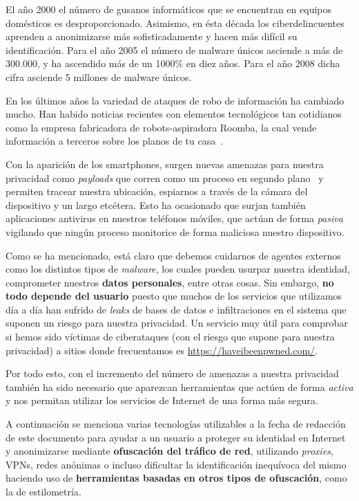 El año 2000 el número de gusanos informáticos que se encuentran en equipos domésticos es desproporcionado. Asimismo, en ésta década los ciberdelincuentes aprenden a anonimizarse más sofisticadamente y hacen más difícil su identificación.
Para el año 2005 el número de malware únicos asciende a más de 300.000, y ha ascendido más de un 1000\% en diez años. Para el año 2008 dicha cifra asciende 5 millones de malware únicos.~\cite{article:number_malware}

En los últimos años la variedad de ataques de robo de información ha cambiado mucho. Han habido noticias recientes con elementos tecnológicos tan cotidianos como la empresa fabricadora de robots-aspiradora Roomba, la cual vende información a terceros sobre los planos de tu casa~\cite{article:roomba}. 

Con la aparición de los smartphones, surgen nuevas amenazas para nuestra privacidad como \textit{payloads} que corren como un proceso en segundo plano~\cite{article:android} y permiten tracear nuestra ubicación, espiarnos a través de la cámara del dispositivo y un largo etcétera. Esto ha ocasionado que surjan también aplicaciones antivirus en nuestros teléfonos móviles, que actúan de forma \textit{pasiva} vigilando que ningún proceso monitorice de forma maliciosa nuestro dispositivo. 

Como se ha mencionado, está claro que debemos cuidarnos de agentes externos como los distintos tipos de \textit{malware}, los cuales pueden usurpar nuestra identidad, comprometer nuestros \textbf{datos personales}, entre otras cosas. 
Sin embargo, \textbf{no todo depende del usuario }puesto que muchos de los servicios que utilizamos día a día han sufrido de \textit{leaks} de bases de datos e infiltraciones en el sistema que suponen un riesgo para nuestra privacidad. Un servicio muy útil para comprobar si hemos sido víctimas de ciberataques (con el riesgo que supone para nuestra privacidad) a sitios donde frecuentamos es \url{https://haveibeenpwned.com/}.

Por todo esto, con el incremento del número de amenazas a nuestra privacidad también ha sido necesario que aparezcan herramientas que actúen de forma \textit{activa} y nos permitan utilizar los servicios de Internet de una forma más segura.

	
\label{sec:a_favor}

A continuación se menciona varias tecnologías utilizables a la fecha de redacción de este documento para ayudar a un usuario a proteger su identidad en Internet y anonimizarse mediante \textbf{ofuscación del tráfico de red}, utilizando \textit{proxies}, VPNs, redes anónimas o incluso dificultar la identificación inequívoca del mismo haciendo uso de \textbf{herramientas basadas en otros tipos de ofuscación}, como la de estilometría.

